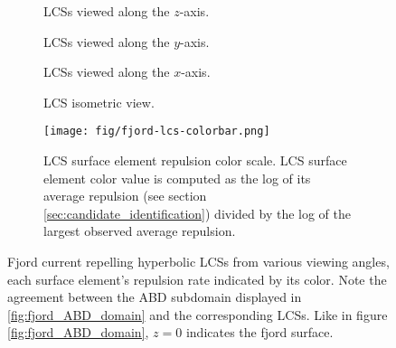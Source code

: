 \begin{figure}[h!] 

\centering
\begin{subfigure}[b]{0.40\textwidth}
\centering

\caption{LCSs viewed along the $z$-axis.}\label{fig:fjord_LCS_a}
\end{subfigure}
\begin{subfigure}[b]{0.40\textwidth}
\centering

\caption{LCSs viewed along the $y$-axis.}\label{fig:fjord_LCS_b}
\end{subfigure}
\begin{subfigure}[b]{0.40\textwidth}
\centering

\caption{LCSs viewed along the $x$-axis.}\label{fig:fjord_LCS_c}
\end{subfigure}
\begin{subfigure}[b]{0.40\textwidth}
\centering

\caption{LCS isometric view.}\label{fig:fjord_LCS_d}
\end{subfigure}

\begin{subfigure}[b]{0.80\textwidth}
\centering
%
\texttt{[image: fig/fjord-lcs-colorbar.png]}
\caption{LCS surface element repulsion color scale. LCS surface element color value is computed as the log of its average repulsion (see section \ref{sec:candidate_identification}) divided by the log of the largest observed average repulsion.}\label{fig:fjord_LCS_bar}
\end{subfigure}

\caption{Fjord current repelling hyperbolic LCSs from various viewing angles, each surface element's repulsion rate indicated by its color. Note the agreement between the ABD subdomain displayed in \ref{fig:fjord_ABD_domain} and the corresponding LCSs. Like in figure \ref{fig:fjord_ABD_domain}, $z=0$ indicates the fjord surface.}\label{fig:fjord_LCS}
\end{figure}

